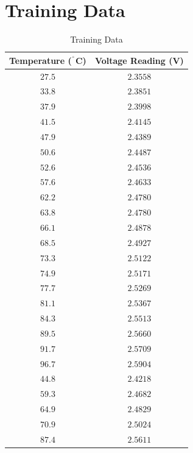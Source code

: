 \documentclass{article}
\begin{document}
\section{Training Data}
\begin{table}[H]
    \centering
    \caption{Training Data}
    \begin{tabular}{cc}
        \toprule
        Temperature ($^{\degree}$C) & Voltage Reading (V) \\
        \midrule
        $27.5$ & $2.3558$ \\
        $33.8$ & $2.3851$ \\
        $37.9$ & $2.3998$ \\
        $41.5$ & $2.4145$ \\
        $47.9$ & $2.4389$ \\
        $50.6$ & $2.4487$ \\
        $52.6$ & $2.4536$ \\
        $57.6$ & $2.4633$ \\
        $62.2$ & $2.4780$ \\
        $63.8$ & $2.4780$ \\
        $66.1$ & $2.4878$ \\
        $68.5$ & $2.4927$ \\
        $73.3$ & $2.5122$ \\
        $74.9$ & $2.5171$ \\
        $77.7$ & $2.5269$ \\
        $81.1$ & $2.5367$ \\
        $84.3$ & $2.5513$ \\
        $89.5$ & $2.5660$ \\
        $91.7$ & $2.5709$ \\
        $96.7$ & $2.5904$ \\
        $44.8$ & $2.4218$ \\
        $59.3$ & $2.4682$ \\
        $64.9$ & $2.4829$ \\
        $70.9$ & $2.5024$ \\
        $87.4$ & $2.5611$ \\
        \bottomrule
    \end{tabular}
    \label{tab:trainingdata}
\end{table}
\end{document}
